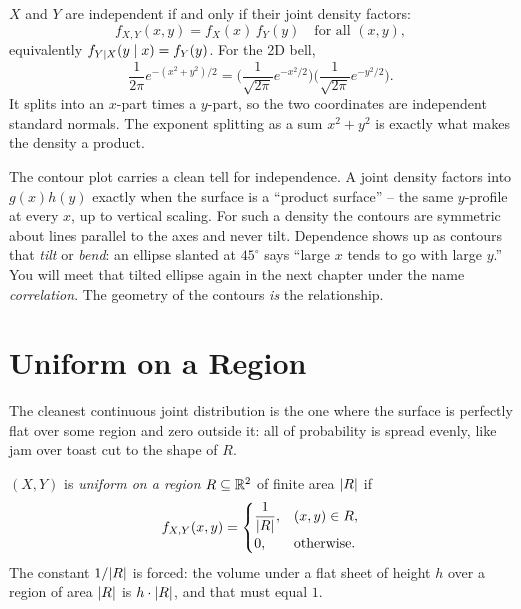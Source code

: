\begin{definition}
\label{ch13:def-indep-cont}
$X$ and $Y$ are independent if and only if their joint density factors:
\[
  f_{X,Y}(x,y) = f_X(x)\,f_Y(y) \quad\text{for all } (x,y),
\]
equivalently $f_{Y\mid X}(y\mid x) = f_Y(y)$. For the 2D bell,
\[
  \frac{1}{2\pi}e^{-(x^2+y^2)/2} = \Big(\frac{1}{\sqrt{2\pi}}e^{-x^2/2}\Big)
  \Big(\frac{1}{\sqrt{2\pi}}e^{-y^2/2}\Big).
\]
It splits into an $x$-part times a $y$-part, so the two coordinates are independent standard normals. The exponent
splitting as a sum $x^2+y^2$ is exactly what makes the density a product.
\end{definition}

\begin{aestheticbox}
The contour plot carries a clean tell for independence. A joint
density factors into $g(x)h(y)$ exactly when the surface is a
``product surface'' -- the same $y$-profile at every $x$, up to vertical
scaling. For such a density the contours are symmetric about lines parallel to the
axes and never tilt. Dependence shows up as contours that \emph{tilt} or
\emph{bend}: an ellipse
slanted at $45^\circ$ says ``large $x$ tends to go with large $y$.'' You will
meet that tilted ellipse again in the next chapter under the name
\emph{correlation}. The geometry of the contours \emph{is} the relationship.
\end{aestheticbox}

\section{Uniform on a Region}
\label{ch13:uniform}

The cleanest continuous joint distribution is the one where the surface is
perfectly flat over some region and zero outside it: all of probability is spread
evenly, like jam over toast cut to the shape of $R$.

\begin{definition}
\label{ch13:def-uniform}
$(X,Y)$ is \emph{uniform on a region} $R\subseteq\mathbb{R}^2$ of finite area
$\lvert R\rvert$ if
\[
  f_{X,Y}(x,y) =
  \begin{cases}
    \dfrac{1}{\lvert R\rvert}, & (x,y)\in R,\\[1.2ex]
    0, & \text{otherwise.}
  \end{cases}
\]
The constant $1/\lvert R\rvert$ is forced: the volume under a flat sheet of height $h$
over a region of area $\lvert R\rvert$ is $h\cdot\lvert R\rvert$, and that must equal $1$.
\end{definition}

